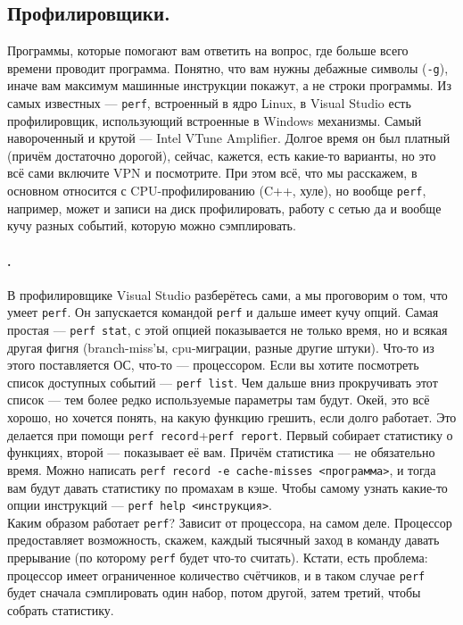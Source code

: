 \documentclass{article}
\begin{document}
    \subsection{Профилировщики.}
    Программы, которые помогают вам ответить на вопрос, где больше всего времени проводит программа. Понятно, что вам нужны дебажные символы (\texttt{-g}), иначе вам максимум машинные инструкции покажут, а не строки программы. Из самых известных --- \texttt{perf}, встроенный в ядро Linux, в Visual Studio есть профилировщик, использующий встроенные в Windows механизмы. Самый навороченный и крутой --- Intel VTune Amplifier. Долгое время он был платный (причём достаточно дорогой), сейчас, кажется, есть какие-то варианты, но это всё сами включите VPN и посмотрите. При этом всё, что мы расскажем, в основном относится с CPU-профилированию (C++, хуле), но вообще \texttt{perf}, например, может и записи на диск профилировать, работу с сетью да и вообще кучу разных событий, которую можно сэмплировать.
    \paragraph{.}
    В профилировщике Visual Studio разберётесь сами, а мы проговорим о том, что умеет \texttt{perf}. Он запускается командой \texttt{perf} и дальше имеет кучу опций. Самая простая --- \texttt{perf stat}, с этой опцией показывается не только время, но и всякая другая фигня (branch-miss'ы, cpu-миграции, разные другие штуки). Что-то из этого поставляется ОС, что-то --- процессором. Если вы хотите посмотреть список доступных событий --- \texttt{perf list}. Чем дальше вниз прокручивать этот список --- тем более редко используемые параметры там будут. Окей, это всё хорошо, но хочется понять, на какую функцию грешить, если долго работает. Это делается при помощи \texttt{perf record}+\texttt{perf report}. Первый собирает статистику о функциях, второй --- показывает её вам. Причём статистика --- не обязательно время. Можно написать \texttt{perf record -e cache-misses <программа>}, и тогда вам будут давать статистику по промахам в кэше. Чтобы самому узнать какие-то опции инструкций --- \texttt{perf help <инструкция>}.\\
    Каким образом работает \texttt{perf}? Зависит от процессора, на самом деле. Процессор предоставляет возможность, скажем, каждый тысячный заход в команду давать прерывание (по которому \texttt{perf} будет что-то считать). Кстати, есть проблема: процессор имеет ограниченное количество счётчиков, и в таком случае \texttt{perf} будет сначала сэмплировать один набор, потом другой, затем третий, чтобы собрать статистику.
\end{document}

